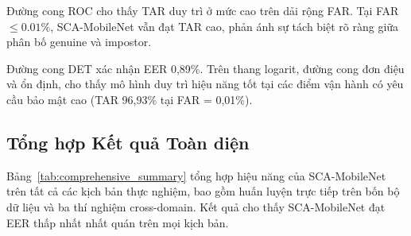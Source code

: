 \documentclass[12pt,a4paper]{article}
\begin{document}
Đường cong ROC cho thấy TAR duy trì ở mức cao trên dải rộng FAR. Tại FAR $\leq 0.01\%$, SCA-MobileNet vẫn đạt TAR cao, phản ánh sự tách biệt rõ ràng giữa phân bố genuine và impostor.

Đường cong DET xác nhận EER 0,89\%. Trên thang logarit, đường cong đơn điệu và ổn định, cho thấy mô hình duy trì hiệu năng tốt tại các điểm vận hành có yêu cầu bảo mật cao (TAR 96,93\% tại FAR = 0,01\%).

\subsection{Tổng hợp Kết quả Toàn diện}

Bảng~\ref{tab:comprehensive_summary} tổng hợp hiệu năng của SCA-MobileNet trên tất cả các kịch bản thực nghiệm, bao gồm huấn luyện trực tiếp trên bốn bộ dữ liệu và ba thí nghiệm cross-domain. Kết quả cho thấy SCA-MobileNet đạt EER thấp nhất nhất quán trên mọi kịch bản.

\begin{table}[H]
\caption{Tổng hợp hiệu năng SCA-MobileNet trên tất cả các kịch bản thực nghiệm. ``Train$\rightarrow$Test'' chỉ kịch bản cross-domain (không fine-tuning).}
\begin{center}
\label{tab:comprehensive_summary}
\end{center}
\end{table}
\end{document}
